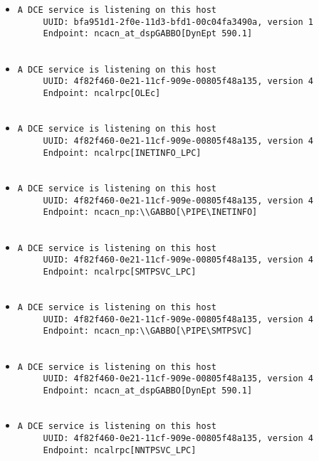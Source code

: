 \documentclass{article}
\begin{document}
\begin{itemize}
\begin{verbatim}
\end{verbatim}\item \begin{verbatim}
A DCE service is listening on this host
     UUID: bfa951d1-2f0e-11d3-bfd1-00c04fa3490a, version 1
     Endpoint: ncacn_at_dspGABBO[DynEpt 590.1]


\end{verbatim}\item \begin{verbatim}
A DCE service is listening on this host
     UUID: 4f82f460-0e21-11cf-909e-00805f48a135, version 4
     Endpoint: ncalrpc[OLEc]


\end{verbatim}\item \begin{verbatim}
A DCE service is listening on this host
     UUID: 4f82f460-0e21-11cf-909e-00805f48a135, version 4
     Endpoint: ncalrpc[INETINFO_LPC]


\end{verbatim}\item \begin{verbatim}
A DCE service is listening on this host
     UUID: 4f82f460-0e21-11cf-909e-00805f48a135, version 4
     Endpoint: ncacn_np:\\GABBO[\PIPE\INETINFO]


\end{verbatim}\item \begin{verbatim}
A DCE service is listening on this host
     UUID: 4f82f460-0e21-11cf-909e-00805f48a135, version 4
     Endpoint: ncalrpc[SMTPSVC_LPC]


\end{verbatim}\item \begin{verbatim}
A DCE service is listening on this host
     UUID: 4f82f460-0e21-11cf-909e-00805f48a135, version 4
     Endpoint: ncacn_np:\\GABBO[\PIPE\SMTPSVC]


\end{verbatim}\item \begin{verbatim}
A DCE service is listening on this host
     UUID: 4f82f460-0e21-11cf-909e-00805f48a135, version 4
     Endpoint: ncacn_at_dspGABBO[DynEpt 590.1]


\end{verbatim}\item \begin{verbatim}
A DCE service is listening on this host
     UUID: 4f82f460-0e21-11cf-909e-00805f48a135, version 4
     Endpoint: ncalrpc[NNTPSVC_LPC]



\end{verbatim}
\end{itemize}
\end{document}
